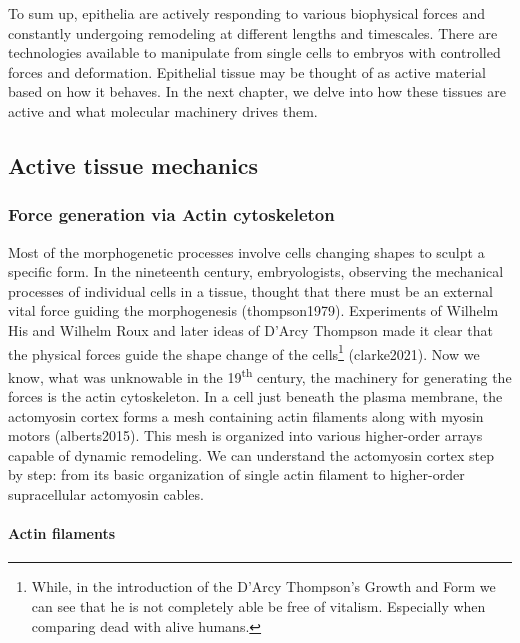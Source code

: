 \documentclass[
]{article}
\begin{document}
To sum up, epithelia are actively responding to various biophysical
forces and constantly undergoing remodeling at different lengths and
timescales. There are technologies available to manipulate from single
cells to embryos with controlled forces and deformation. Epithelial
tissue may be thought of as active material based on how it behaves. In
the next chapter, we delve into how these tissues are active and what
molecular machinery drives them.

\hypertarget{active-tissue-mechanics-1}{%
\subsection{Active tissue mechanics}\label{active-tissue-mechanics-1}}

\hypertarget{force-generation-via-actin-cytoskeleton}{%
\subsubsection{Force generation via Actin
cytoskeleton}\label{force-generation-via-actin-cytoskeleton}}

Most of the morphogenetic processes involve cells changing shapes to
sculpt a specific form. In the nineteenth century, embryologists,
observing the mechanical processes of individual cells in a tissue,
thought that there must be an external vital force guiding the
morphogenesis (thompson1979). Experiments of Wilhelm His and Wilhelm
Roux and later ideas of D'Arcy Thompson made it clear that the physical
forces guide the shape change of the cells\footnote{While, in the
  introduction of the D'Arcy Thompson's Growth and Form we can see that
  he is not completely able be free of vitalism. Especially when
  comparing dead with alive humans.} (clarke2021). Now we know, what was
unknowable in the 19\textsuperscript{th} century, the machinery for
generating the forces is the actin cytoskeleton. In a cell just beneath
the plasma membrane, the actomyosin cortex forms a mesh containing actin
filaments along with myosin motors (alberts2015). This mesh is organized
into various higher-order arrays capable of dynamic remodeling. We can
understand the actomyosin cortex step by step: from its basic
organization of single actin filament to higher-order supracellular
actomyosin cables.

\hypertarget{actin-filaments}{%
\paragraph{Actin filaments}\label{actin-filaments}}
\end{document}
